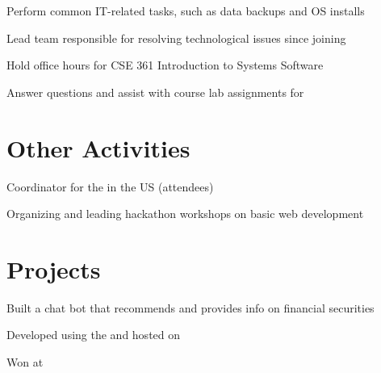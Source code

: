 \documentclass[]{deedy-resume-openfont}
\begin{document}
\begin{minipage}[t]{0.66\textwidth}
\begin{tightemize}
\item Perform common IT-related tasks, such as data backups and OS installs
\item Lead team responsible for resolving  technological issues since joining
\end{tightemize}
\sectionsep

\begin{tightemize}
\item Hold office hours for CSE 361 Introduction to Systems Software
\item Answer questions and assist with course lab assignments for 
\end{tightemize}
\sectionsep


\section{Other Activities}

\begin{tightemize}
\item Coordinator for the  in the US (attendees)
\item Organizing and leading hackathon workshops on basic web development
\end{tightemize}
\sectionsep


\section{Projects}
\descript{}
\begin{tightemize}
\item Built a chat bot that recommends and provides info on financial securities
\item Developed using the  and hosted on 
\item Won  at 
\end{tightemize}
\sectionsep


\end{minipage}
\end{document}
